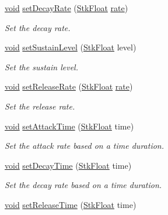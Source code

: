 \begin{DoxyCompactItemize}
\hyperlink{sound_8c_ae35f5844602719cf66324f4de2a658b3}{void} \hyperlink{class_nyq_1_1_a_d_s_r_aef6e55bf97d22bf7f9b17d0cb386cf7b}{set\+Decay\+Rate} (\hyperlink{namespace_nyq_a044fa20a706520a617bbbf458a7db7e4}{Stk\+Float} \hyperlink{seqread_8c_ad89d3fac2deab7a9cf6cfc8d15341b85}{rate})
\begin{DoxyCompactList}\small\item\em Set the decay rate. \end{DoxyCompactList}\item 
\hyperlink{sound_8c_ae35f5844602719cf66324f4de2a658b3}{void} \hyperlink{class_nyq_1_1_a_d_s_r_ae45c858f4b1eedb5615c6cb108ea16f5}{set\+Sustain\+Level} (\hyperlink{namespace_nyq_a044fa20a706520a617bbbf458a7db7e4}{Stk\+Float} level)
\begin{DoxyCompactList}\small\item\em Set the sustain level. \end{DoxyCompactList}\item 
\hyperlink{sound_8c_ae35f5844602719cf66324f4de2a658b3}{void} \hyperlink{class_nyq_1_1_a_d_s_r_abdfc89aad3910347dbb49be82f7ad36b}{set\+Release\+Rate} (\hyperlink{namespace_nyq_a044fa20a706520a617bbbf458a7db7e4}{Stk\+Float} \hyperlink{seqread_8c_ad89d3fac2deab7a9cf6cfc8d15341b85}{rate})
\begin{DoxyCompactList}\small\item\em Set the release rate. \end{DoxyCompactList}\item 
\hyperlink{sound_8c_ae35f5844602719cf66324f4de2a658b3}{void} \hyperlink{class_nyq_1_1_a_d_s_r_a9d8a56b2c6cdb32ff53383af32920cca}{set\+Attack\+Time} (\hyperlink{namespace_nyq_a044fa20a706520a617bbbf458a7db7e4}{Stk\+Float} time)
\begin{DoxyCompactList}\small\item\em Set the attack rate based on a time duration. \end{DoxyCompactList}\item 
\hyperlink{sound_8c_ae35f5844602719cf66324f4de2a658b3}{void} \hyperlink{class_nyq_1_1_a_d_s_r_a195f12e23f62185e65be0c36e74c9508}{set\+Decay\+Time} (\hyperlink{namespace_nyq_a044fa20a706520a617bbbf458a7db7e4}{Stk\+Float} time)
\begin{DoxyCompactList}\small\item\em Set the decay rate based on a time duration. \end{DoxyCompactList}\item 
\hyperlink{sound_8c_ae35f5844602719cf66324f4de2a658b3}{void} \hyperlink{class_nyq_1_1_a_d_s_r_a32b5d6a866524b0f448c902478b40678}{set\+Release\+Time} (\hyperlink{namespace_nyq_a044fa20a706520a617bbbf458a7db7e4}{Stk\+Float} time)

\end{DoxyCompactItemize}
